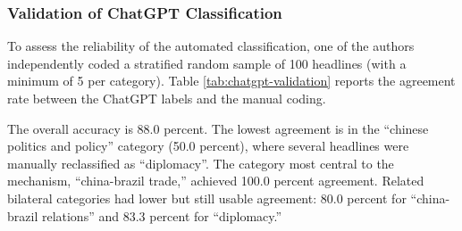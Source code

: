 \documentclass[
  12pt,
]{article}
\begin{document}
\subsubsection{Validation of ChatGPT Classification}\label{validation-of-chatgpt-classification}

To assess the reliability of the automated classification, one of the authors independently coded a stratified random sample of 100 headlines (with a minimum of 5 per category). Table \ref{tab:chatgpt-validation} reports the agreement rate between the ChatGPT labels and the manual coding.

\begin{table}[H]
\centering
\caption{\label{tab:chatgpt-validation}Validation of ChatGPT classification against manual coding (N = 100). Overall accuracy: 88.0 percent.}
\centering
{}
\end{table}

The overall accuracy is 88.0 percent. The lowest agreement is in the ``chinese politics and policy'' category (50.0 percent), where several headlines were manually reclassified as ``diplomacy''. The category most central to the mechanism, ``china-brazil trade,'' achieved 100.0 percent agreement. Related bilateral categories had lower but still usable agreement: 80.0 percent for ``china-brazil relations'' and 83.3 percent for ``diplomacy.''
\end{document}
